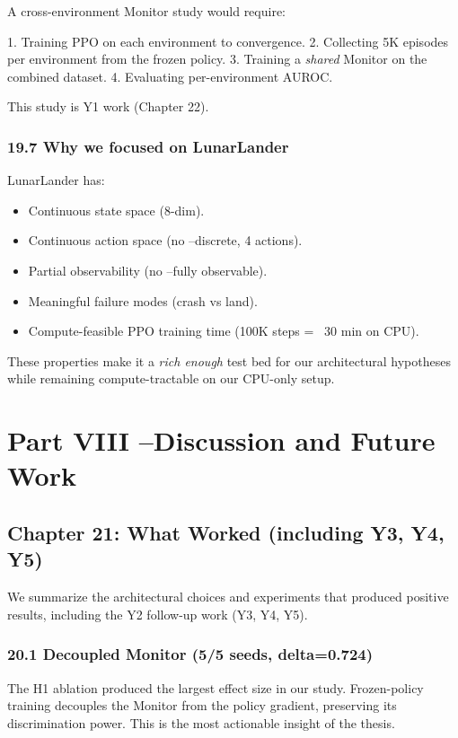 \documentclass[11pt]{article}
\begin{document}
A cross-environment Monitor study would require:

1. Training PPO on each environment to convergence.
2. Collecting 5K episodes per environment from the frozen policy.
3. Training a \textit{shared} Monitor on the combined dataset.
4. Evaluating per-environment AUROC.

This study is Y1 work (Chapter 22).

\subsubsection{19.7 Why we focused on LunarLander}

LunarLander has:

\begin{itemize}
  \item Continuous state space (8-dim).
  \item Continuous action space (no --discrete, 4 actions).
  \item Partial observability (no --fully observable).
  \item Meaningful failure modes (crash vs land).
  \item Compute-feasible PPO training time (100K steps = ~30 min on CPU).
\end{itemize}


These properties make it a \textit{rich enough} test bed for our architectural
hypotheses while remaining compute-tractable on our CPU-only setup.

\hrulefill

\section{Part VIII --Discussion and Future Work}

\subsection{Chapter 21: What Worked (including Y3, Y4, Y5)}

We summarize the architectural choices and experiments that produced positive
results, including the Y2 follow-up work (Y3, Y4, Y5).

\subsubsection{20.1 Decoupled Monitor (5/5 seeds, delta=0.724)}

The H1 ablation produced the largest effect size in our study. Frozen-policy
training decouples the Monitor from the policy gradient, preserving its
discrimination power. This is the most actionable insight of the thesis.
\end{document}
